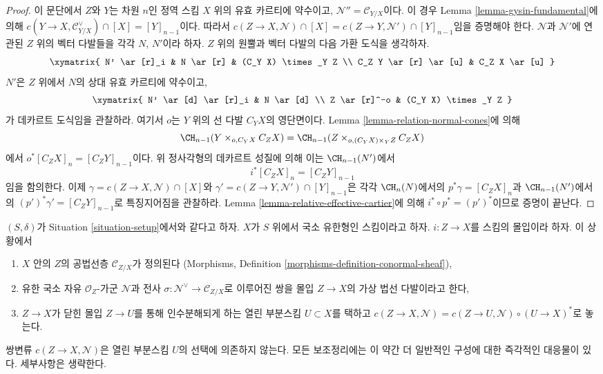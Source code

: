 \begin{proof}
\medskip\noindent
이 문단에서 $Z$와 $Y$는 차원 $n$인 정역 스킴 $X$ 위의 유효
카르티에 약수이고, $\mathcal{N}'' = \mathcal{C}_{Y/X}$이다. 이 경우
Lemma \ref{lemma-gysin-fundamental}에 의해
$c(Y \to X, \mathcal{C}_{Y/X}^\vee) \cap [X] = [Y]_{n - 1}$이다.
따라서
$c(Z \to X, \mathcal{N}) \cap [X] = c(Z \to Y, \mathcal{N}') \cap [Y]_{n - 1}$임을
증명해야 한다. $\mathcal{N}$과 $\mathcal{N}'$에 연관된 $Z$ 위의 벡터
다발들을 각각 $N$, $N'$이라 하자. $Z$ 위의 원뿔과 벡터 다발의
다음 가환 도식을 생각하자.
$$
\xymatrix{
N' \ar[r]_i &
N \ar[r] &
(C_Y X) \times_Y Z \\
C_Z Y \ar[r] \ar[u] &
C_Z X \ar[u]
}
$$
$N'$은 $Z$ 위에서 $N$의 상대 유효 카르티에 약수이고,
$$
\xymatrix{
N' \ar[d] \ar[r]_i & N \ar[d] \\
Z \ar[r]^-o & (C_Y X) \times_Y Z
}
$$
가 데카르트 도식임을 관찰하라. 여기서 $o$는 $Y$ 위의 선 다발
$C_Y X$의 영단면이다. Lemma \ref{lemma-relation-normal-cones}에 의해
$$
\CH_{n - 1}(Y \times_{o, C_Y X} C_ZX) =
\CH_{n - 1}(Z \times_{o, (C_Y X) \times_Y Z} C_ZX)
$$
에서 $o^*[C_ZX]_n = [C_Z Y]_{n - 1}$이다. 위 정사각형의 데카르트
성질에 의해 이는 $\CH_{n - 1}(N')$에서
$$
i^*[C_ZX]_n = [C_Z Y]_{n - 1}
$$
임을 함의한다. 이제 $\gamma = c(Z \to X, \mathcal{N}) \cap [X]$와
$\gamma' = c(Z \to Y, \mathcal{N}') \cap [Y]_{n - 1}$은 각각
$\CH_n(N)$에서의 $p^*\gamma = [C_Z X]_n$과
$\CH_{n - 1}(N')$에서의 $(p')^*\gamma' = [C_Z Y]_{n - 1}$로
특징지어짐을 관찰하라. Lemma \ref{lemma-relative-effective-cartier}에
의해 $i^* \circ p^* = (p')^*$이므로 증명이 끝난다.
\end{proof}

\begin{remark}[몰입에 대한 변형]
\label{remark-gysin-for-immersion}
$(S, \delta)$가 Situation \ref{situation-setup}에서와 같다고 하자.
$X$가 $S$ 위에서 국소 유한형인 스킴이라고 하자.
$i : Z \to X$를 스킴의 몰입이라 하자. 이 상황에서
\begin{enumerate}
\item $X$ 안의 $Z$의 공법선층 $\mathcal{C}_{Z/X}$가 정의된다
(Morphisms, Definition \ref{morphisms-definition-conormal-sheaf}),
\item 유한 국소 자유 $\mathcal{O}_Z$-가군 $\mathcal{N}$과 전사
$\sigma : \mathcal{N}^\vee \to \mathcal{C}_{Z/X}$로 이루어진 쌍을
몰입 $Z \to X$의 가상 법선 다발이라고 한다,
\item $Z \to X$가 닫힌 몰입 $Z \to U$를 통해 인수분해되게 하는 열린
부분스킴 $U \subset X$를 택하고
$c(Z \to X, \mathcal{N}) = c(Z \to U, \mathcal{N}) \circ (U \to X)^*$로
놓는다.
\end{enumerate}
쌍변류 $c(Z \to X, \mathcal{N})$은 열린 부분스킴 $U$의 선택에
의존하지 않는다. 모든 보조정리에는 이 약간 더 일반적인 구성에 대한
즉각적인 대응물이 있다. 세부사항은 생략한다.
\end{remark}







